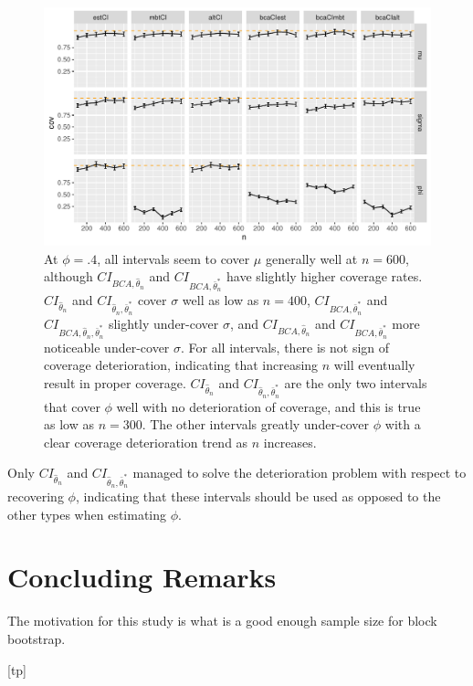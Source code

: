 \documentclass[12pt, letterpaper, titlepage]{article}
\begin{document}
\begin{figure}[tbp]
\caption{}
  \centering
  \includegraphics[width=\textwidth]{figures/plot_.4}
  \caption{At $\phi = .4$, all intervals seem to cover $\mu$ generally well at $n = 600$, although $CI_{BCA, \hat{\theta}_{n}}$ and $CI_{BCA, \bar\theta_n^*}$ have slightly higher coverage rates. $CI_{\hat{\theta}_{n}}$ and $CI_{\hat{\theta}_{n}, \bar\theta_n^*}$ cover $\sigma$ well as low as $n = 400$, $CI_{BCA, \bar\theta_n^*}$ and $CI_{BCA, \hat{\theta}_{n}, \bar\theta_n^*}$ slightly under-cover $\sigma$, and $CI_{BCA, \hat{\theta}_{n}}$ and $CI_{BCA, \bar\theta_n^*}$ more noticeable under-cover $\sigma$. For all intervals, there is not sign of coverage deterioration, indicating that increasing $n$ will eventually result in proper coverage. $CI_{\hat{\theta}_{n}}$ and $CI_{\hat{\theta}_{n}, \bar\theta_n^*}$ are the only two intervals that cover $\phi$ well with no deterioration of coverage, and this is true as low as $n = 300$. The other intervals greatly under-cover $\phi$ with a clear coverage deterioration trend as $n$ increases.}
  \label{fig:plot_.4}
\end{figure}

Only $CI_{\hat{\theta}_{n}}$ and $CI_{\hat{\theta}_{n}, \bar\theta_n^*}$ managed to solve the deterioration problem with respect to recovering $\phi$, indicating that these intervals should be used as opposed to the other types when estimating $\phi$.

\section{Concluding Remarks}
\label{sec:conremarks}

The motivation for this study is what is a good enough sample size for block bootstrap. 



[tp]
\end{document}
